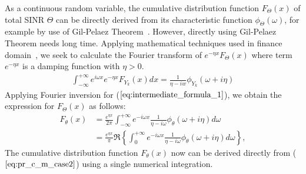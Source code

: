 As a continuous random variable, the cumulative distribution function $F_{\Theta}\left( x \right)$ of total SINR $\Theta$ can be directly derived from its characteristic function $\phi_{\Theta}\left(\omega\right)$, for example by use of Gil-Pelaez Theorem~\cite{gil1951note}. However, directly using Gil-Pelaez Theorem needs long time. Applying mathematical techniques used in finance domain~\cite{hirsa2012computational}, we seek to calculate the Fourier transform of $e^{-\eta x} F_{\Theta}\left( x \right)$ where term $e^{-\eta x}$ is a damping function with $\eta > 0$. 
\begin{align}
\label{eq:intermediate_formula_1}
\int_{-\infty}^{+\infty} e^{i\omega x} e^{-\eta x} F_{Y_k}\left( x \right) dx = \frac{1}{\eta - iw} \phi_{Y_{k}}\left( \omega +i\eta \right) 
\end{align}
Applying Fourier inversion for ($\ref{eq:intermediate_formula_1}$), we obtain the expression for $F_{\Theta}\left( x \right)$ as follows:
\begin{align}
\label{eq:pr_c_m_case2}
F_{\theta}\left( x \right)  &= \frac{e^{\eta x}}{2\pi} \int_{-\infty}^{+\infty} e^{-i \omega x} \frac{1}{\eta - i\omega} \phi_{\theta}\left( \omega +i\eta\right) d\omega  \nonumber\\
&= \frac{e^{\eta x}}{\pi} \Re\left\lbrace  \int_{0}^{+\infty} e^{-i \omega x} \frac{1}{\eta - i\omega} \phi_{\theta}\left( \omega +i\eta\right) d\omega\right\rbrace, 
\end{align}
The cumulative distribution function $F_{\theta}\left( x \right)$ now can be derived directly from ($\ref{eq:pr_c_m_case2}$) using a single numerical integration.

